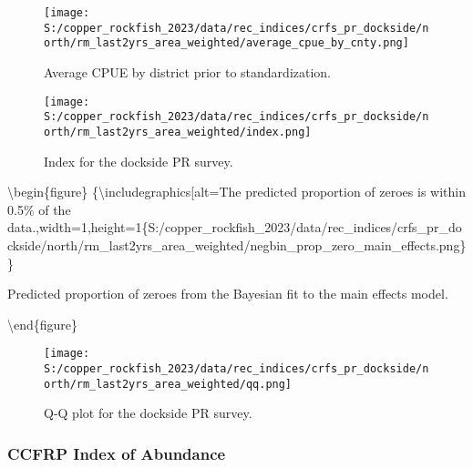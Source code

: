 \documentclass[11pt,
  letterpaper,
]{article}
\begin{document}
\begin{figure}
{\centering
\texttt{[image: S:/copper\_rockfish\_2023/data/rec\_indices/crfs\_pr\_dockside/north/rm\_last2yrs\_area\_weighted/average\_cpue\_by\_cnty.png]}
}
\caption{Average CPUE by district prior to standardization.\label{fig:pr-districtcpue}}
\end{figure}

\newpage

\begin{figure}
{\centering
\texttt{[image: S:/copper\_rockfish\_2023/data/rec\_indices/crfs\_pr\_dockside/north/rm\_last2yrs\_area\_weighted/index.png]}
}
\caption{Index for the dockside PR survey.\label{fig:pr-index}}
\end{figure}

\newpage

\textbackslash begin\{figure\} \{\centering \textbackslash includegraphics{[}alt=The predicted proportion of zeroes is within 0.5\% of the data.,width=1\textwidth,height=1\textheight{]}\{S:/copper\_rockfish\_2023/data/rec\_indices/crfs\_pr\_dockside/north/rm\_last2yrs\_area\_weighted/negbin\_prop\_zero\_main\_effects.png\} \}

\caption{Predicted proportion of zeroes from the Bayesian fit to the main effects model.\label{fig:pr-prop-zero}}

\textbackslash end\{figure\}

\newpage

\begin{figure}
{\centering
\texttt{[image: S:/copper\_rockfish\_2023/data/rec\_indices/crfs\_pr\_dockside/north/rm\_last2yrs\_area\_weighted/qq.png]}
}
\caption{Q-Q plot for the dockside PR survey.\label{fig:pr-qq}}
\end{figure}

\newpage

\subsubsection{CCFRP Index of Abundance}\label{ccfrp-index}
\end{document}
